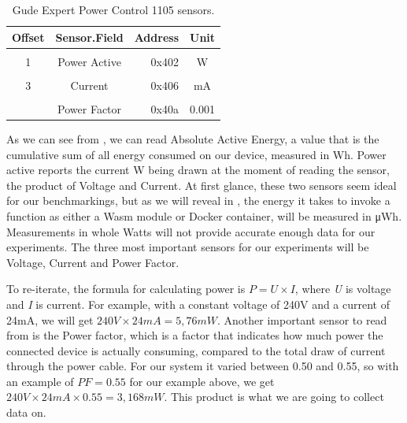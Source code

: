 \documentclass[
  table]{report}
\begin{document}
\begin{table}[H]
\centering
\caption{\label{tab:unnamed-chunk-1}Gude Expert Power Control 1105 sensors. \label{tab:gude_config}}
\centering
\begin{tabular}[t]{ccrc}
\toprule
Offset & Sensor.Field & Address & Unit\\
\midrule
\cellcolor{gray!10}{0} & \cellcolor{gray!10}{Absolute Active Energy} & \cellcolor{gray!10}{0x400} & \cellcolor{gray!10}{Wh}\\
1 & Power Active & 0x402 & W\\
\cellcolor{gray!10}{2} & \cellcolor{gray!10}{Voltage} & \cellcolor{gray!10}{0x404} & \cellcolor{gray!10}{V}\\
3 & Current & 0x406 & mA\\
\cellcolor{gray!10}{4} & \cellcolor{gray!10}{Frequency} & \cellcolor{gray!10}{0x408} & \cellcolor{gray!10}{0.01hz}\\
\addlinespace
5 & Power Factor & 0x40a & 0.001\\
\bottomrule
\end{tabular}
\end{table}

As we can see from , we can read Absolute Active
Energy, a value that is the cumulative sum of all energy consumed on our
device, measured in Wh. Power active reports the current W being drawn
at the moment of reading the sensor, the product of Voltage and Current.
At first glance, these two sensors seem ideal for our benchmarkings, but
as we will reveal in , the energy it takes to invoke
a function as either a \ac{Wasm} module or Docker container, will be
measured in μWh. Measurements in whole Watts will not provide accurate
enough data for our experiments. The three most important sensors for
our experiments will be Voltage, Current and Power Factor.

To re-iterate, the formula for calculating power is \(P = U \times I\),
where \emph{U} is voltage and \emph{I} is current. For example, with a
constant voltage of 240V and a current of 24mA, we will get
\(240V \times 24mA = 5,76mW\). Another important sensor to read from is
the Power factor, which is a factor that indicates how much power the
connected device is actually consuming, compared to the total draw of
current through the power cable. For our system it varied between 0.50
and 0.55, so with an example of \(PF = 0.55\) for our example above, we
get \(240V \times 24mA \times 0.55 = 3,168mW\). This product is what we
are going to collect data on.
\end{document}
